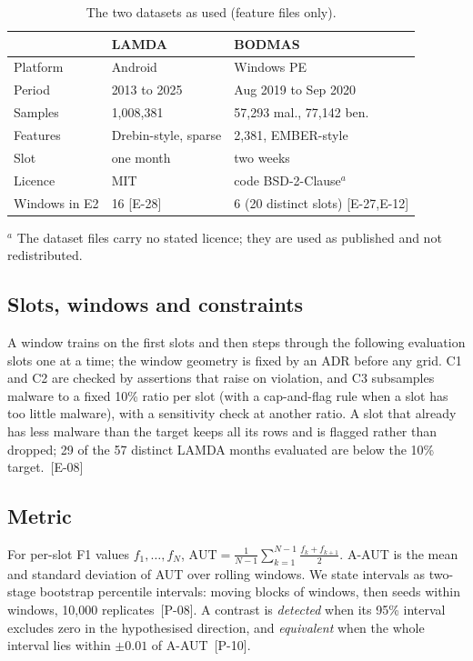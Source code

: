 \documentclass[conference,a4paper]{IEEEtran}
\newcommand{\clm}[1]{{\scriptsize[#1]}}
\begin{document}
\begin{table}[t]
\centering
\caption{The two datasets as used (feature files only).}
\label{tab:data}
\small
\begin{tabular}{@{}lll@{}}
\toprule
 & LAMDA & BODMAS\\
\midrule
Platform & Android & Windows PE\\
Period & 2013 to 2025 & Aug 2019 to Sep 2020\\
Samples & 1,008,381 & 57,293 mal., 77,142 ben.\\
Features & Drebin-style, sparse & 2,381, EMBER-style\\
Slot & one month & two weeks\\
Licence & MIT & code BSD-2-Clause$^{a}$\\
Windows in E2 & 16 \clm{E-28} & 6 (20 distinct slots) \clm{E-27,E-12}\\
\bottomrule
\end{tabular}

\smallskip
\raggedright\scriptsize $^{a}$ The dataset files carry no stated licence; they are used as published and not redistributed.
\end{table}

\subsection{Slots, windows and constraints}
A window trains on the first slots and then steps through the following evaluation slots one at a time; the window geometry is fixed by an ADR before any grid. C1 and C2 are checked by assertions that raise on violation, and C3 subsamples malware to a fixed 10\% ratio per slot (with a cap-and-flag rule when a slot has too little malware), with a sensitivity check at another ratio. A slot that already has less malware than the target keeps all its rows and is flagged rather than dropped; 29 of the 57 distinct LAMDA months evaluated are below the 10\% target.~\clm{E-08}

\subsection{Metric}
For per-slot F1 values $f_1,\dots,f_N$, $\mathrm{AUT}=\frac{1}{N-1}\sum_{k=1}^{N-1}\frac{f_k+f_{k+1}}{2}$. A-AUT is the mean and standard deviation of AUT over rolling windows. We state intervals as two-stage bootstrap percentile intervals: moving blocks of windows, then seeds within windows, 10,000 replicates~\clm{P-08}. A contrast is \emph{detected} when its 95\% interval excludes zero in the hypothesised direction, and \emph{equivalent} when the whole interval lies within $\pm0.01$ of A-AUT~\clm{P-10}.
\end{document}
